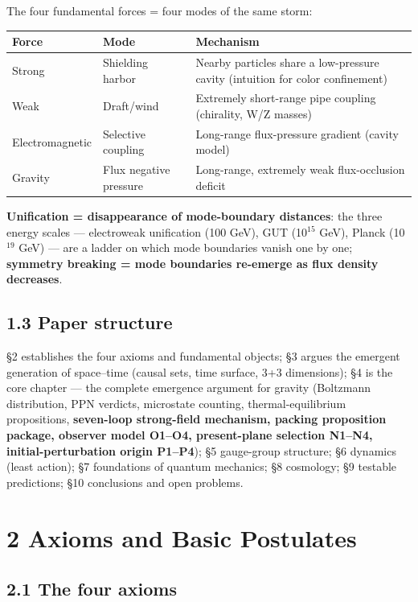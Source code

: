 \documentclass[12pt]{article}
\newcommand{\up}[1]{\ensuremath{^{#1}}}
\begin{document}
The four fundamental forces = four modes of the same storm:

\begin{table}[htbp]
\centering
\small
\begin{tabularx}{\textwidth}{@{}lXX@{}}
\toprule
Force & Mode & Mechanism \\
\midrule
Strong & Shielding harbor & Nearby particles share a low-pressure cavity (intuition for color confinement) \\
Weak & Draft/wind & Extremely short-range pipe coupling (chirality, W/Z masses) \\
Electromagnetic & Selective coupling & Long-range flux-pressure gradient (cavity model) \\
Gravity & Flux negative pressure & Long-range, extremely weak flux-occlusion deficit \\
\bottomrule
\end{tabularx}
\end{table}

\textbf{Unification = disappearance of mode-boundary distances}: the three energy scales --- electroweak unification (100 GeV), GUT (10\up{15} GeV), Planck (10\up{19} GeV) --- are a ladder on which mode boundaries vanish one by one; \textbf{symmetry breaking = mode boundaries re-emerge as flux density decreases}.

\subsection{1.3 Paper structure}

\S{}2 establishes the four axioms and fundamental objects; \S{}3 argues the emergent generation of space--time (causal sets, time surface, 3+3 dimensions); \S{}4 is the core chapter --- the complete emergence argument for gravity (Boltzmann distribution, PPN verdicts, microstate counting, thermal-equilibrium propositions, \textbf{seven-loop strong-field mechanism, packing proposition package, observer model O1--O4, present-plane selection N1--N4, initial-perturbation origin P1--P4}); \S{}5 gauge-group structure; \S{}6 dynamics (least action); \S{}7 foundations of quantum mechanics; \S{}8 cosmology; \S{}9 testable predictions; \S{}10 conclusions and open problems.


\section{2 Axioms and Basic Postulates}

\subsection{2.1 The four axioms}
\end{document}
